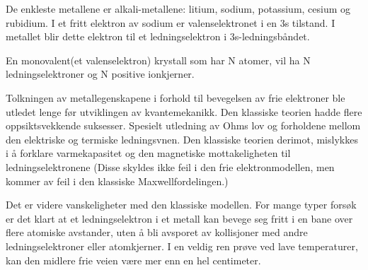 \documentclass{article}
\begin{document}
De enkleste metallene er alkali-metallene: litium, sodium, potassium, cesium og rubidium. I et fritt elektron av sodium er valenselektronet i en 3s tilstand. I metallet blir dette elektron til et ledningselektron i 3s-ledningsbåndet.

En monovalent(et valenselektron) krystall som har N atomer, vil ha N ledningselektroner og N positive ionkjerner. 

Tolkningen av metallegenskapene i forhold til bevegelsen av frie elektroner ble utledet lenge før utviklingen av kvantemekanikk. Den klassiske teorien hadde flere oppsiktsvekkende suksesser. Spesielt utledning av Ohms lov og forholdene mellom den elektriske og termiske ledningsvnen. Den klassiske teorien derimot, mislykkes i å forklare varmekapasitet og den magnetiske mottakeligheten til ledningselektronene (Disse skyldes ikke feil i den frie elektronmodellen, men kommer av feil i den klassiske Maxwellfordelingen.)

Det er videre vanskeligheter med den klassiske modellen. For mange typer forsøk er det klart at et ledningselektron i et metall kan bevege seg fritt i en bane over flere atomiske avstander, uten å bli avsporet av kollisjoner med andre ledningselektroner eller atomkjerner. I en veldig ren prøve ved lave temperaturer, kan den midlere frie veien være mer enn en hel centimeter.
\end{document}
